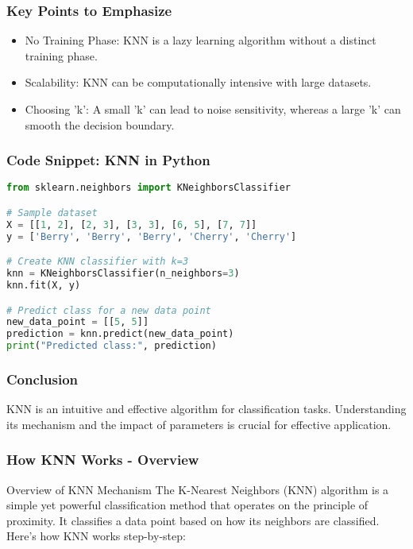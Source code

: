 \documentclass[aspectratio=169]{beamer}
\begin{document}
\begin{frame}
    \frametitle{Key Points to Emphasize}
    \begin{itemize}
        \item No Training Phase: KNN is a lazy learning algorithm without a distinct training phase.
        \item Scalability: KNN can be computationally intensive with large datasets.
        \item Choosing 'k': A small 'k' can lead to noise sensitivity, whereas a large 'k' can smooth the decision boundary.
    \end{itemize}
\end{frame}

\begin{frame}[fragile]
    \frametitle{Code Snippet: KNN in Python}
    \begin{lstlisting}[language=Python]
from sklearn.neighbors import KNeighborsClassifier

# Sample dataset
X = [[1, 2], [2, 3], [3, 3], [6, 5], [7, 7]]
y = ['Berry', 'Berry', 'Berry', 'Cherry', 'Cherry']

# Create KNN classifier with k=3
knn = KNeighborsClassifier(n_neighbors=3)
knn.fit(X, y)

# Predict class for a new data point
new_data_point = [[5, 5]]
prediction = knn.predict(new_data_point)
print("Predicted class:", prediction)
    \end{lstlisting}
\end{frame}

\begin{frame}
    \frametitle{Conclusion}
    KNN is an intuitive and effective algorithm for classification tasks. Understanding its mechanism and the impact of parameters is crucial for effective application.
\end{frame}

\begin{frame}[fragile]
    \frametitle{How KNN Works - Overview}
    \begin{block}{Overview of KNN Mechanism}
        The K-Nearest Neighbors (KNN) algorithm is a simple yet powerful classification method that operates on the principle of proximity. It classifies a data point based on how its neighbors are classified. Here’s how KNN works step-by-step:
    \end{block}
\end{frame}
\end{document}
